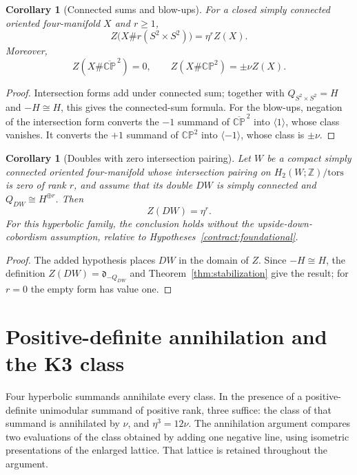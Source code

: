 \documentclass[11pt,a4paper]{amsart}
\newcommand{\Z}{\mathbb Z}
\newcommand{\CP}{\mathbb{CP}}
\newcommand{\dclass}{\mathfrak d}
\theoremstyle{plain}
\newtheorem{corollary}[theorem]{Corollary}
\theoremstyle{definition}
\theoremstyle{remark}
\begin{document}
\begin{corollary}[Connected sums and blow-ups]\label{cor:connected-blowup}
For a closed simply connected oriented four-manifold $X$ and $r\ge1$,
\[
 Z\bigl(X\#r(S^2\times S^2)\bigr)=\eta^rZ(X).
\]
Moreover,
\[
 Z(X\#\overline{\CP}^{\,2})=0,
 \qquad
 Z(X\#\CP^2)=\pm\nu Z(X).
\]
\end{corollary}

\begin{proof}
Intersection forms add under connected sum; together with
$Q_{S^2\times S^2}=H$ and $-H\cong H$, this gives the connected-sum
formula. For the blow-ups, negation of the intersection form converts the
$-1$ summand of $\overline{\CP}^{\,2}$ into $\langle1\rangle$, whose
class vanishes. It converts the $+1$ summand of $\CP^2$ into
$\langle-1\rangle$, whose class is $\pm\nu$.
\end{proof}

\begin{corollary}[Doubles with zero intersection pairing]\label{cor:doubles}
Let $W$ be a compact simply connected oriented four-manifold whose
intersection pairing on $H_2(W;\Z)/\mathrm{tors}$ is zero of rank $r$,
and assume that its double $DW$ is simply connected and
$Q_{DW}\cong H^{\oplus r}$. Then
\[
 Z(DW)=\eta^r.
\]
For this hyperbolic family, the conclusion holds without the
upside-down-cobordism assumption, relative to
Hypotheses~\ref{contract:foundational}.
\end{corollary}

\begin{proof}
The added hypothesis places $DW$ in the domain of $Z$.
Since $-H\cong H$, the definition $Z(DW)=\dclass_{-Q_{DW}}$
and Theorem~\ref{thm:stabilization} give the result; for $r=0$
the empty form has value one.
\end{proof}

\section{Positive-definite annihilation and the K3 class}\label{sec:positive}

Four hyperbolic summands annihilate every class. In the presence of a
positive-definite unimodular summand of positive rank, three suffice:
the class of that summand is annihilated by $\nu$, and $\eta^3=12\nu$.
The annihilation argument compares two evaluations of the class obtained
by adding one negative line, using isometric presentations of the
enlarged lattice. That lattice is retained throughout the argument.
\end{document}
